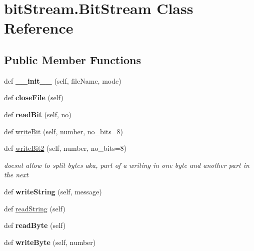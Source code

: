 \hypertarget{classbitStream_1_1BitStream}{}\section{bit\+Stream.\+Bit\+Stream Class Reference}
\label{classbitStream_1_1BitStream}
\subsection*{Public Member Functions}
\begin{DoxyCompactItemize}
\item 
\mbox{\label{classbitStream_1_1BitStream_aeff23940a2511ca632aea9d4a86052fc}} 
def {\bfseries \+\_\+\+\_\+init\+\_\+\+\_\+} (self, file\+Name, mode)
\item 
\mbox{\label{classbitStream_1_1BitStream_abdc1de0dcf34a9a263fccd3d97d82458}} 
def {\bfseries close\+File} (self)
\item 
\mbox{\label{classbitStream_1_1BitStream_a2b292086f5a9f3a6d484c66beb269bac}} 
def {\bfseries read\+Bit} (self, no)
\item 
def \hyperlink{classbitStream_1_1BitStream_af4fe2752f4ced1a45314bcd5549442f8}{write\+Bit} (self, number, no\+\_\+bits=8)
\item 
def \hyperlink{classbitStream_1_1BitStream_af8a10dd7fc3b4da5a580287e59bb5448}{write\+Bit2} (self, number, no\+\_\+bits=8)
\begin{DoxyCompactList}\small\item\em doesnt allow to split bytes aka, part of a writing in one byte and another part in the next \end{DoxyCompactList}\item 
\mbox{\label{classbitStream_1_1BitStream_a743ef3eee521eef0760c4cb951f25160}} 
def {\bfseries write\+String} (self, message)
\item 
def \hyperlink{classbitStream_1_1BitStream_aef1601d4c082bb0cc73cba258d52cc18}{read\+String} (self)
\item 
\mbox{\label{classbitStream_1_1BitStream_a3eb48bb74e77b4d52588eba59666d9de}} 
def {\bfseries read\+Byte} (self)
\item 
\mbox{\label{classbitStream_1_1BitStream_a6193b5353517a59ba179d3667473b573}} 
def {\bfseries write\+Byte} (self, number)
\end{DoxyCompactItemize}

